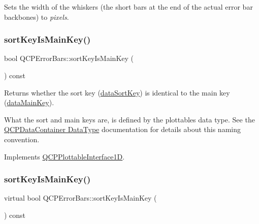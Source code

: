 Sets the width of the whiskers (the short bars at the end of the actual error bar backbones) to {\itshape pixels}. \mbox{\label{class_q_c_p_error_bars_aa00fcef7b0cb5c54bafe32ab4b16e674}} 
\subsubsection{\texorpdfstring{sort\+Key\+Is\+Main\+Key()}{sortKeyIsMainKey()}\hspace{0.1cm}{\footnotesize\ttfamily [1/2]}}
{\footnotesize\ttfamily bool Q\+C\+P\+Error\+Bars\+::sort\+Key\+Is\+Main\+Key (\begin{DoxyParamCaption}{ }\end{DoxyParamCaption}) const\hspace{0.3cm}{\ttfamily [virtual]}}

Returns whether the sort key (\hyperlink{class_q_c_p_error_bars_a1ef91328ad7dde84695958139d5f40cf}{data\+Sort\+Key}) is identical to the main key (\hyperlink{class_q_c_p_error_bars_ae3931213f76cd34a824c42c22a1dca74}{data\+Main\+Key}).

What the sort and main keys are, is defined by the plottable\textquotesingle{}s data type. See the \hyperlink{class_q_c_p_data_container_qcpdatacontainer-datatype}{Q\+C\+P\+Data\+Container Data\+Type} documentation for details about this naming convention. 

Implements \hyperlink{class_q_c_p_plottable_interface1_d_a229e65e7ab968dd6cd0e259fa504b79d}{Q\+C\+P\+Plottable\+Interface1D}.

\mbox{\label{class_q_c_p_error_bars_a2e5264bcd56e516d2ce0e1bdbccb4e6c}} 
\subsubsection{\texorpdfstring{sort\+Key\+Is\+Main\+Key()}{sortKeyIsMainKey()}\hspace{0.1cm}{\footnotesize\ttfamily [2/2]}}
{\footnotesize\ttfamily virtual bool Q\+C\+P\+Error\+Bars\+::sort\+Key\+Is\+Main\+Key (\begin{DoxyParamCaption}{ }\end{DoxyParamCaption}) const\hspace{0.3cm}{\ttfamily [virtual]}}

